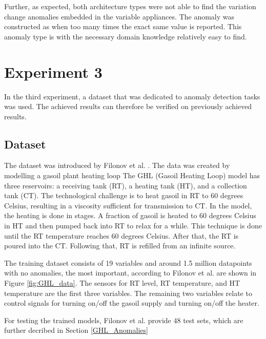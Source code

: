 Further, as expected, both architecture types were not able to find the variation change anomalies embedded in the variable appliances. The anomaly was constructed as when too many times the exact same value is reported. This anomaly type is with the necessary domain knowledge relatively easy to find.

\section{Experiment 3}
In the third experiment, a dataset that was dedicated to anomaly detection tasks was used. The achieved results can therefore be verified on previously achieved results.

\subsection{Dataset} \label{GHL_Dataset}
The dataset was introduced by Filonov et al. \parencite{Filonov2016}. The data was created by modelling a gasoil plant heating loop The GHL (Gasoil Heating Loop) model has three reservoirs: a receiving tank (RT), a heating tank (HT), and a collection tank (CT). The technological challenge is to heat gasoil in RT to 60 degrees Celsius, resulting in a viscosity sufficient for transmission to CT. In the model, the heating is done in stages. A fraction of gasoil is heated to 60 degrees Celsius in HT and then pumped back into RT to relax for a while. This technique is done until the RT temperature reaches 60 degrees Celsius. After that, the RT is poured into the CT. Following that, RT is refilled from an infinite source.

The training dataset consists of 19 variables and around 1.5 million datapoints with no anomalies, the most important, according to Filonov et al. \parencite{Filonov2016} are shown in Figure \ref{fig:GHL_data}. The sensors for RT level, RT temperature, and HT temperature are the first three variables. The remaining two variables relate to control signals for turning on/off the gasoil supply and turning on/off the heater.

For testing the trained models, Filonov et al. \parencite*{Filonov2016} provide 48 test sets, which are further decribed in Section \ref{GHL_Anomalies}

